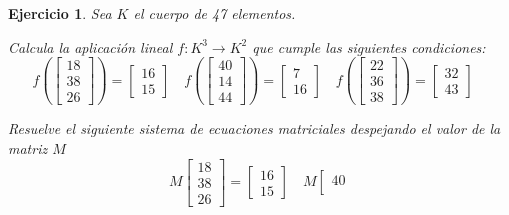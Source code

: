 \documentclass[12pt]{amsart}
\newtheorem{ejer}{Ejercicio}
\begin{document}
\begin{ejer} Sea $K$ el cuerpo de 47 elementos.
\newline
\noindent\begin{minipage}{\textwidth}
\begin{tcolorbox}[colback = green!20!white,title=Versión Aplicación]
Calcula la aplicaci\'on lineal $f:K^{3} \to K^{2}$ que cumple las siguientes condiciones: 
\[f\left(\left[\begin{array}{r}
18 \\
38 \\
26
\end{array}\right]\right) = \left[\begin{array}{r}
16 \\
15
\end{array}\right] \quad f\left(\left[\begin{array}{r}
40 \\
14 \\
44
\end{array}\right]\right) = \left[\begin{array}{r}
7 \\
16
\end{array}\right] \quad f\left(\left[\begin{array}{r}
22 \\
36 \\
38
\end{array}\right]\right) = \left[\begin{array}{r}
32 \\
43
\end{array}\right] \quad 
\]\end{tcolorbox}
\end{minipage} \newline
\noindent\begin{minipage}{\textwidth}
\begin{tcolorbox}[colback = blue!20!white,title=Versión Sistema Matricial]
Resuelve el siguiente sistema de ecuaciones matriciales despejando el valor de la matriz $M$
\[M \left[\begin{array}{r}
18 \\
38 \\
26
\end{array}\right] = \left[\begin{array}{r}
16 \\
15
\end{array}\right] \quad M \left[\begin{array}{r}
40 \\

\end{array}\]
\end{tcolorbox}
\end{minipage}
\end{ejer}
\end{document}

